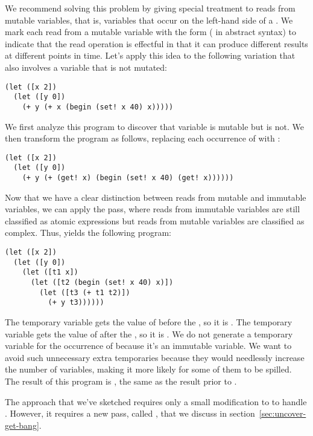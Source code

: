 \documentclass[7x10]{TimesAPriori_MIT}%
\numberwithin{theorem}{chapter}
\numberwithin{definition}{chapter}
\numberwithin{equation}{chapter}
\begin{document}
{We recommend solving this problem by giving special treatment to reads
from mutable variables, that is, variables that occur on the left-hand
side of a . We mark each read from a mutable variable with
the form  ( in abstract syntax) to indicate
that the read operation is effectful in that it can produce different
results at different points in time. Let's apply this idea to the
following variation that also involves a variable that is not mutated:
\begin{lstlisting}
(let ([x 2])
  (let ([y 0])
    (+ y (+ x (begin (set! x 40) x)))))
\end{lstlisting}
We first analyze this program to discover that variable 
is mutable but  is not. We then transform the program as
follows, replacing each occurrence of  with :
\begin{lstlisting}
(let ([x 2])
  (let ([y 0])
    (+ y (+ (get! x) (begin (set! x 40) (get! x))))))
\end{lstlisting}
Now that we have a clear distinction between reads from mutable and
immutable variables, we can apply the 
pass, where reads from immutable variables are still classified as
atomic expressions but reads from mutable variables are classified as
complex.  Thus,  yields the following
program:\\
\begin{minipage}{\textwidth}
\begin{lstlisting}
(let ([x 2])
  (let ([y 0])
    (let ([t1 x])
      (let ([t2 (begin (set! x 40) x)])
        (let ([t3 (+ t1 t2)])
          (+ y t3))))))
\end{lstlisting}
\end{minipage}
The temporary variable  gets the value of  before the
, so it is .  The temporary variable  gets
the value of  after the , so it is .  We
do not generate a temporary variable for the occurrence of 
because it's an immutable variable. We want to avoid such unnecessary
extra temporaries because they would needlessly increase the number of
variables, making it more likely for some of them to be spilled.  The
result of this program is , the same as the result prior to
.

The approach that we've sketched requires only a small
modification to  to handle
. However, it requires a new pass, called
, that we discuss in
section~\ref{sec:uncover-get-bang}.

}
\end{document}
